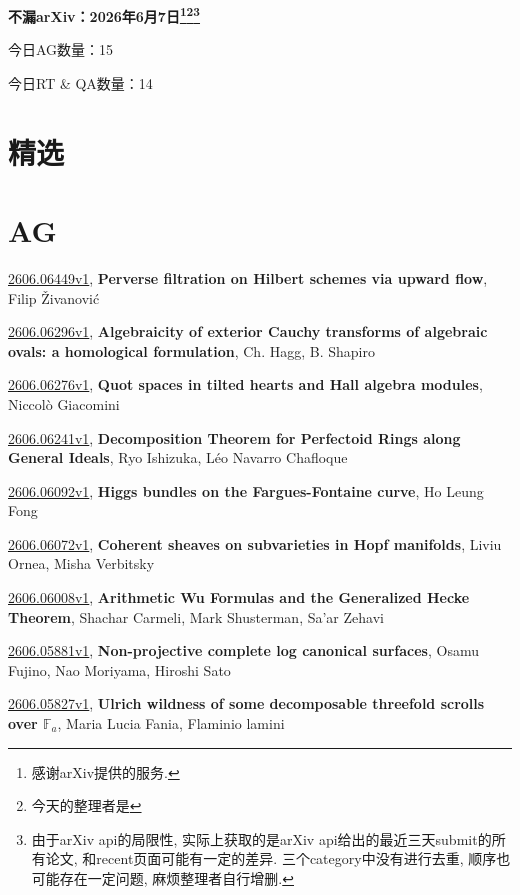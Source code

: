 \documentclass[9pt, a4paper]{article}
\theoremstyle{plain}
\theoremstyle{definition}
\theoremstyle{remark}
\newcommand{\arxiv}[3]{\href{https://arxiv.org/abs/#1}{#1}, \textbf{\textcolor{arxivblue}{#2}}, #3}
\newcommand{\AGnumber}{15}
\newcommand{\RTQAnumber}{14}
\newcommand{\NewestDate}{2026年6月7日}
\newcommand{\todayarXiver}{} %
\begin{document}
\begin{center}
    \Huge\textbf{不漏arXiv：\NewestDate\footnote{感谢arXiv提供的服务.}\footnote{今天的整理者是\todayarXiver}\footnote{由于arXiv api的局限性, 实际上获取的是arXiv api给出的最近三天submit的所有论文, 和recent页面可能有一定的差异. 三个category中没有进行去重, 顺序也可能存在一定问题, 麻烦整理者自行增删.}} \\
\end{center}

\setcounter{section}{-1}

\begin{center}
    今日AG数量：\AGnumber
    
    今日RT \& QA数量：\RTQAnumber
    
\end{center}


\section{精选}


\section{AG}
\arxiv{2606.06449v1}{Perverse filtration on Hilbert schemes via upward flow}{Filip Živanović}

\arxiv{2606.06296v1}{Algebraicity of exterior Cauchy transforms of algebraic ovals: a homological formulation}{Ch. Hagg, B. Shapiro}

\arxiv{2606.06276v1}{Quot spaces in tilted hearts and Hall algebra modules}{Niccolò Giacomini}

\arxiv{2606.06241v1}{Decomposition Theorem for Perfectoid Rings along General Ideals}{Ryo Ishizuka, Léo Navarro Chafloque}

\arxiv{2606.06092v1}{Higgs bundles on the Fargues-Fontaine curve}{Ho Leung Fong}

\arxiv{2606.06072v1}{Coherent sheaves on subvarieties in Hopf manifolds}{Liviu Ornea, Misha Verbitsky}

\arxiv{2606.06008v1}{Arithmetic Wu Formulas and the Generalized Hecke Theorem}{Shachar Carmeli, Mark Shusterman, Sa'ar Zehavi}

\arxiv{2606.05881v1}{Non-projective complete log canonical surfaces}{Osamu Fujino, Nao Moriyama, Hiroshi Sato}

\arxiv{2606.05827v1}{Ulrich wildness of some decomposable threefold scrolls over $\mathbb F_a$}{Maria Lucia Fania, Flaminio lamini}
\end{document}
